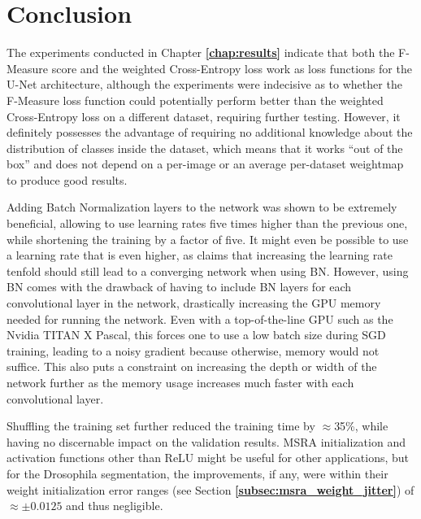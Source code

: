 \chapter {Conclusion}
\label{chap:conclusion}

The experiments conducted in Chapter \textbf{\ref{chap:results}} indicate that both the F-Measure score and the weighted Cross-Entropy loss work as loss functions for the U-Net architecture, although the experiments were indecisive as to whether the F-Measure loss function could potentially perform better than the weighted Cross-Entropy loss on a different dataset, requiring further testing. However, it definitely possesses the advantage of requiring no additional knowledge about the distribution of classes inside the dataset, which means that it works ``out of the box'' and does not depend on a per-image or an average per-dataset weightmap to produce good results.

Adding Batch Normalization layers to the network was shown to be extremely beneficial, allowing to use learning rates five times higher than the previous one, while shortening the training by a factor of five. It might even be possible to use a learning rate that is even higher, as \cite{batchnorm} claims that increasing the learning rate tenfold should still lead to a converging network when using BN. However, using BN comes with the drawback of having to include BN layers for each convolutional layer in the network, drastically increasing the GPU memory needed for running the network. Even with a top-of-the-line GPU such as the Nvidia TITAN X Pascal, this forces one to use a low batch size during SGD training, leading to a noisy gradient because otherwise, memory would not suffice. This also puts a constraint on increasing the depth or width of the network further as the memory usage increases much faster with each convolutional layer.

Shuffling the training set further reduced the training time by $\approx$35\%, while having no discernable impact on the validation results. MSRA initialization and activation functions other than ReLU might be useful for other applications, but for the Drosophila segmentation, the improvements, if any, were within their weight initialization error ranges (see Section \textbf{\ref{subsec:msra_weight_jitter}}) of $\approx\pm0.0125$  and thus negligible.

